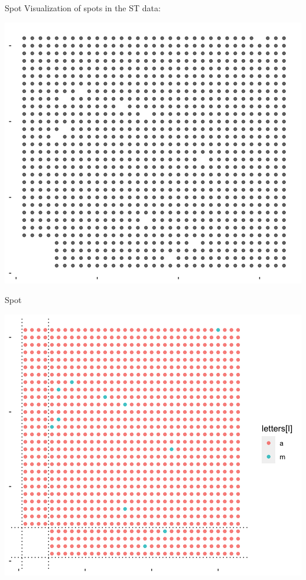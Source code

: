 \documentclass[10 pt]{beamer}
\begin{document}
\begin{frame}{Spot}
Visualization of spots in the ST data:
\centerline{\includegraphics[scale=0.4]{pic/spots_ori.png}}

\end{frame}

\begin{frame}{Spot}
\centerline{\includegraphics[scale=0.5]{pic/spots_na.png}}
\end{frame}
\end{document}

